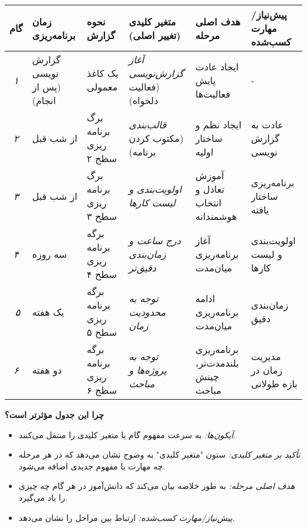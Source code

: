 \documentclass{article}
\begin{document}
\begin{center}
\begin{tabular}{|c|m{}|m{}|m{}|m{}|m{}|}
\hline
\textbf{گام} & \textbf{زمان برنامه‌ریزی} & \textbf{نحوه گزارش} & \textbf{متغیر کلیدی (تغییر اصلی)} & \textbf{هدف اصلی مرحله} & \textbf{پیش‌نیاز/مهارت کسب‌شده} \\
\hline
 \textit{۱} & گزارش نویسی (پس از انجام) & یک کاغذ معمولی &  \textit{آغاز گزارش‌نویسی} (فعالیت دلخواه) & ایجاد عادت پایش فعالیت‌ها & - \\
\hline
 \textit{۲} & از شب قبل & برگ برنامه ریزی سطح ۲ &  \textit{قالب‌بندی} (مکتوب کردن برنامه) & ایجاد نظم و ساختار اولیه & عادت به گزارش نویسی \\
\hline
 \textit{۳} & از شب قبل & برگ برنامه ریزی سطح ۳ &  \textit{اولویت‌بندی و لیست کارها} & آموزش تعادل و انتخاب هوشمندانه & برنامه‌ریزی ساختار یافته \\
\hline
 \textit{۴} & سه روزه & برگه برنامه ریزی سطح ۴ &  \textit{درج ساعت و زمان‌بندی دقیق‌تر} & آغاز برنامه‌ریزی میان‌مدت & اولویت‌بندی و لیست کارها \\
\hline
️ \textit{۵} & یک هفته & برگه برنامه ریزی سطح ۵ &  \textit{توجه به محدودیت زمان} & ادامه برنامه‌ریزی میان‌مدت & زمان‌بندی دقیق \\
\hline
 \textit{۶} & دو هفته & برگه برنامه ریزی سطح ۶ &  \textit{توجه به پروژه‌ها و مباحث} & برنامه‌ریزی بلندمدت‌تر، چینش مباحث & مدیریت زمان در بازه طولانی \\
\hline
\end{tabular}
\end{center}

\vspace{2ex} %

\noindent\textbf{چرا این جدول مؤثرتر است؟}

\begin{itemize}
    \item \textit{آیکون‌ها:} به سرعت مفهوم گام یا متغیر کلیدی را منتقل می‌کنند.
    \item \textit{تأکید بر متغیر کلیدی:} ستون "متغیر کلیدی" به وضوح نشان می‌دهد که در هر مرحله چه مهارت یا مفهوم جدیدی اضافه می‌شود.
    \item \textit{هدف اصلی مرحله:} به طور خلاصه بیان می‌کند که دانش‌آموز در هر گام چه چیزی را یاد می‌گیرد.
    \item \textit{پیش‌نیاز/مهارت کسب‌شده:} ارتباط بین مراحل را نشان می‌دهد.
\end{itemize}
\end{document}
